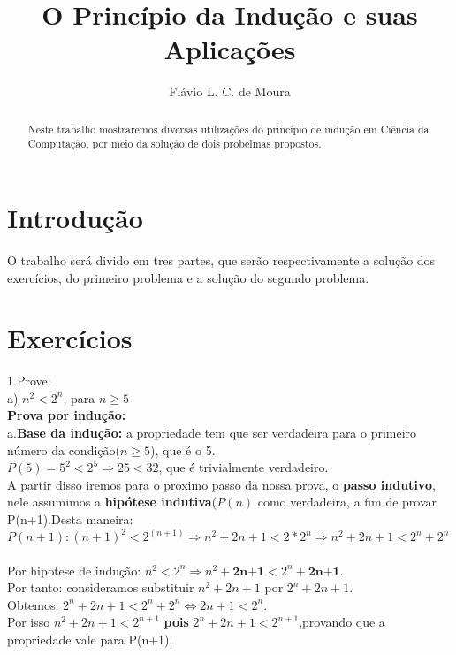 \documentclass[a4paper, 10pt]{article}
\title{\LARGE \bf
O Princípio da Indução e suas Aplicações
}
\author{Flávio L. C. de Moura}
\begin{document}
\maketitle

\begin{abstract}

Neste trabalho mostraremos diversas utilizações do princípio de indução em Ciência da Computação, por meio da solução de dois probelmas propostos.

\end{abstract}

\section{Introdução}

O trabalho será divido em tres partes, que serão respectivamente a solução dos exercícios, do primeiro problema e a solução do segundo problema. 

\section{Exercícios}
1.Prove: \\
a) $n^2 < 2^n$, para $n \geq 5$ \\
\textbf{Prova por indução:} \\
a.\textbf{Base da indução:} a propriedade tem que ser verdadeira para o primeiro número da condição($n \geq 5$), que é o 5. \\

$P(5) = 5^2 < 2^5 \Longrightarrow{} 25 < 32$, que é trivialmente verdadeiro.\checkmark \\

\noindent A partir disso iremos para o proximo passo da nossa prova, o \textbf{passo indutivo}, nele assumimos a \textbf{hipótese indutiva}($P(n)$ como verdadeira, a fim de provar P(n+1).Desta maneira: \\

$P(n+1): (n+1)^2 < 2^{(n+1)} \Longrightarrow n^2+2n+1 < 2*2^n \Longrightarrow n^2+2n+1<2^n + 2^n$ \\ \\
Por hipotese de indução: $n^2 < 2^n \Longrightarrow n^2 + \textbf{2n+1} < 2^n + \textbf{2n+1}$. \\
Por tanto: consideramos substituir $n^2+2n+1$ por $2^n+2n+1$.  \\
Obtemos: $2^n+2n+1 < 2^n+2^n \Longleftrightarrow 2n+1 < 2^n$.  \\
Por isso  $n^2+2n+1  < 2^{n+1}$ \textbf{pois} $2^n+2n+1  < 2^{n+1} $,provando que a propriedade vale para P(n+1).\checkmark\\ 
\end{document}
